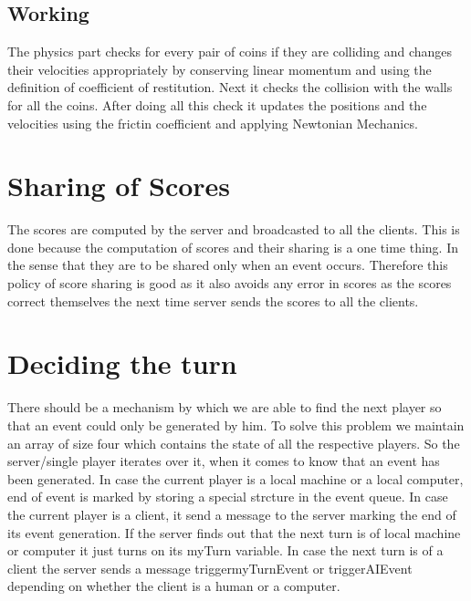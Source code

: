 \documentclass[11pt,a4paper,oneside]{report}
\begin{document}
\subsection{Working}
The physics part checks for every pair of coins if they are colliding and changes their velocities appropriately by conserving linear momentum and using the definition of coefficient of restitution. Next it checks the collision with the walls for all the coins. After doing all this check it updates the positions and the velocities using the frictin coefficient and applying Newtonian Mechanics.

\section{Sharing of Scores}
The scores are computed by the server and broadcasted to all the clients. This is done because the computation of scores and their sharing is a one time thing. In the sense that they are to be shared only when an event occurs. Therefore this policy of score sharing is good as it also avoids any error in scores as the scores correct themselves the next time server sends the scores to all the clients.

\section{Deciding the turn}
There should be a mechanism by which we are able to find the next player so that an event could only be generated by him.
To solve this problem we maintain an array of size four which contains the state of all the respective players. So the server/single player iterates over it, when it comes to know that an event has been generated. In case the current player is a local machine or a local computer, end of event is marked by storing a special strcture in the event queue. In case the current player is a client, it send a message to the server marking the end of its event generation.
If the server finds out that the next turn is of local machine or computer it just turns on its myTurn variable. In case the next turn is of a client the server sends a message triggermyTurnEvent or triggerAIEvent depending on whether the client is a human or a computer.
\end{document}
